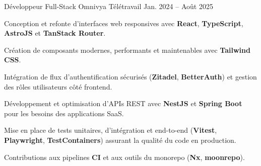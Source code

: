 \begin{cventries}
  \cventry
  {Développeur Full-Stack}
  {Omnivya}
  {Télétravail}
  {Jan. 2024 -- Août 2025}
  {
    \begin{cvitems}
      \item {Conception et refonte d’interfaces web responsives avec \textbf{React}, \textbf{TypeScript}, \textbf{AstroJS} et \textbf{TanStack Router}.}
      \item {Création de composants modernes, performants et maintenables avec \textbf{Tailwind CSS}.}
      \item {Intégration de flux d’authentification sécurisés (\textbf{Zitadel}, \textbf{BetterAuth}) et gestion des rôles utilisateurs côté frontend.}
      \item {Développement et optimisation d’APIs REST avec \textbf{NestJS} et \textbf{Spring Boot} pour les besoins des applications SaaS.}
      \item {Mise en place de tests unitaires, d’intégration et end-to-end (\textbf{Vitest}, \textbf{Playwright}, \textbf{TestContainers}) assurant la qualité du code en production.}
      \item {Contributions aux pipelines \textbf{CI} et aux outils du monorepo (\textbf{Nx}, \textbf{moonrepo}).}
    \end{cvitems}
  }

\end{cventries}
